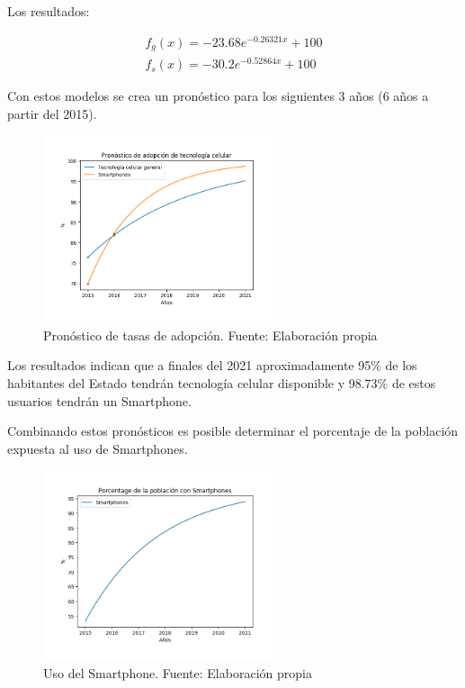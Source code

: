 \documentclass{article}
\begin{document}
Los resultados:

\begin{align*}
f_g(x) = -23.68e^{-0.26321x}+100 \\
f_s(x) = -30.2e^{-0.52864x}+100
\end{align*}

Con estos modelos se crea un pronóstico para los siguientes 3 años (6 años a partir del 2015).

	\begin{figure}[H]\centering
	\includegraphics[width=0.6\textwidth]{resources/img/pronostico_adopcion.png}
	\caption{\label{fig:pron_adp} Pronóstico de tasas de adopción. Fuente: Elaboración propia}
    \end{figure}

Los resultados indican que a finales del 2021 aproximadamente 95\% de los habitantes del Estado
tendrán tecnología celular disponible y 98.73\% de estos usuarios tendrán un Smartphone.

Combinando estos pronósticos es posible determinar el porcentaje de la población expuesta al
uso de Smartphones.

	\begin{figure}[H]\centering
	\includegraphics[width=0.6\textwidth]{resources/img/smartphone_usage.png}
	\caption{\label{fig:smart_usage} Uso del Smartphone. Fuente: Elaboración propia}
    \end{figure}
\end{document}
